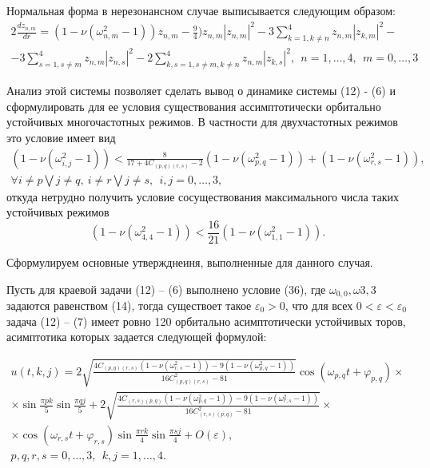 \documentclass[12pt]{article}  %
\begin{document}
Нормальная форма в нерезонансном случае выписывается следующим образом:
\begin{multline}
2\frac{dz_{n,m}}{dr}=(1-\nu(\omega^2_{n,m}-1))z_{n,m} - \frac94)z_{n,m}|z_{n,m}|^2-3\sum_{k=1,k\not=n}^{4}z_{n,m}|z_{k,m}|^2-\\
	-3\sum_{s=1,s\not=m}^{4}z_{n,m}|z_{n,s}|^2 -2\sum_{k,s=1,s\not=m,k\not=n}^{4}z_{n,m}|z_{k,s}|^2, \ \ n=1,\dots,4, \ \ m=0,\dots,3
\end{multline}

Анализ этой системы позволяет сделать вывод о динамике системы (12) - (6) и сформулировать для ее условия существования ассимптотически орбитально устойчивых многочастотных режимов. В частности для двухчастотных режимов это условие имеет вид
\begin{multline}
(1-\nu(\omega^2_{i,j}-1))<\frac8{17+4C_{(p,q)(r,s)}-2}(1-\nu(\omega^2_{p,q}-1))+(1-\nu(\omega^2_{r,s}-1)),\\
\forall i\not=p \bigvee j\not=q, \  i\not=r \bigvee j\not=s, \ \ i,j=0,\dots,3,
\end{multline}
откуда нетрудно получить условие сосуществования максимального числа таких устойчивых режимов
\begin{equation}
(1-\nu(\omega^2_{4,4}-1))<\frac{16}{21}(1-\nu(\omega^2_{1,1}-1)).
\end{equation}

Сформулируем основные утвержднеиня, выполненные для данного случая.
\begin{Th}
	Пусть для краевой задачи (12) \--- (6) выполнено условие (36), где $\omega_{0,0},\omega{3,3}$ задаются равенством (14), тогда существоет такое $\varepsilon_0>0$, что для всех $0<\varepsilon<\varepsilon_0$ задача (12) \--- (7) имеет ровно 120 орбитально асимптотически устойчивых торов, асимптотика которых задается следующей формулой:
\end{Th}
\begin{multline}
u(t,k,j) = 2\sqrt{\frac{4C_{(p,q)(r,s)}(1-\nu(\omega^2_{r,s}-1))-9(1-\nu(\omega^2_{p,q}-1))}{16C^2_{(p,q)(r,s)}-81}}\cos(\omega_{p,q}t+\varphi_{p,q})\times\\
\times\sin\frac{\pi pk}5\sin\frac{\pi qj}5 +2\sqrt{\frac{4C_{(r,s)(p,q)}(1-\nu(\omega^2_{p,q}-1))-9(1-\nu(\omega^2_{r,s}-1))}{16C^2_{(r,s)(p,q)}-81}}\times\\
\times\cos(\omega_{r,s}t+\varphi_{r,s})\sin\frac{\pi rk}4\sin\frac{\pi sj}4 + O(\varepsilon),\\
p,q,r,s=0,\dots,3, \ \  k,j=1,\dots,4.
\end{multline}
\end{document}
